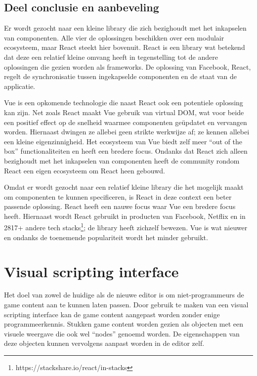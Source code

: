 \subsection{Deel conclusie en aanbeveling}
Er wordt gezocht naar een kleine library die zich bezighoudt met het inkapselen van componenten. Alle vier de oplossingen beschikken over een modulair ecosysteem, maar React steekt hier bovenuit. React is een library wat betekend dat deze een relatief kleine omvang heeft in tegenstelling tot de andere oplossingen die gezien worden als frameworks. De oplossing van Facebook, React, regelt de synchronisatie tussen ingekapselde componenten en de staat van de applicatie.

Vue is een opkomende technologie die naast React ook een potentiele oplossing kan zijn. Net zoals React maakt Vue gebruik van virtual DOM, wat voor beide een positief effect op de snelheid waarmee componenten geüpdatet en vervangen worden. Hiernaast dwingen ze allebei geen strikte werkwijze af; ze kennen allebei een kleine eigenzinnigheid. Het ecosysteem van Vue biedt zelf meer “out of the box” functionaliteiten en heeft een bredere focus. Ondanks dat React zich alleen bezighoudt met het inkapselen van componenten heeft de community rondom React een eigen ecosysteem om React heen gebouwd.

Omdat er wordt gezocht naar een relatief kleine library die het mogelijk maakt om componenten te kunnen specificeren, is React in deze context een beter passende oplossing. React heeft een nauwe focus waar Vue een bredere focus heeft. Hiernaast wordt React gebruikt in producten van Facebook, Netflix\cite{NetflixReact} en in 2817+ andere tech stacks\footnote{https://stackshare.io/react/in-stacks}; de library heeft zichzelf bewezen. Vue is wat nieuwer en ondanks de toenemende populariteit wordt het minder gebruikt.

\section{Visual scripting interface}
Het doel van zowel de huidige als de nieuwe editor is om niet-programmeurs de game content aan te kunnen laten passen. Door gebruik te maken van een visual scripting interface kan de game content aangepast worden zonder enige programmeerkennis\cite{VisualScripting}. Stukken game content worden gezien als objecten met een visuele weergave die ook wel “nodes” genoemd worden. De eigenschappen van deze objecten kunnen vervolgens aanpast worden in de editor zelf.


